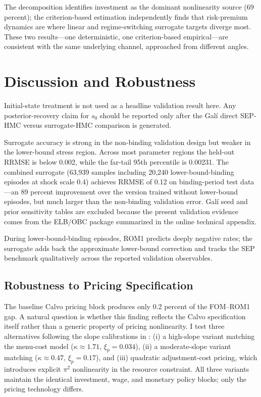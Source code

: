 \documentclass[12pt]{article}
\theoremstyle{plain}
\theoremstyle{definition}
\theoremstyle{remark}
\begin{document}
The decomposition identifies investment as the dominant nonlinearity source (69 percent); the criterion-based estimation independently finds that risk-premium dynamics are where linear and regime-switching surrogate targets diverge most. These two results---one deterministic, one criterion-based empirical---are consistent with the same underlying channel, approached from different angles.


\section{Discussion and Robustness}
\label{sec:robustness}

Initial-state treatment is not used as a headline validation result here. Any posterior-recovery claim for $s_0$ should be reported only after the Gal\'i direct SEP-HMC versus surrogate-HMC comparison is generated.

Surrogate accuracy is strong in the non-binding validation design but weaker in the lower-bound stress region. Across most parameter regions the held-out RRMSE is below 0.002, while the far-tail 95th percentile is 0.00231. The combined surrogate (63,939 samples including 20,240 lower-bound-binding episodes at shock scale 0.4) achieves RRMSE of 0.12 on binding-period test data---an 89 percent improvement over the version trained without lower-bound episodes, but much larger than the non-binding validation error. Gal\'i seed and prior sensitivity tables are excluded because the present validation evidence comes from the ELB/OBC package summarized in the online technical appendix.

During lower-bound-binding episodes, ROM1 predicts deeply negative rates; the surrogate adds back the approximate lower-bound correction and tracks the SEP benchmark qualitatively across the reported validation observables.

\subsection{Robustness to Pricing Specification}
\label{subsec:pricing_robustness}

The baseline Calvo pricing block produces only 0.2 percent of the FOM--ROM1 gap. A natural question is whether this finding reflects the Calvo specification itself rather than a generic property of pricing nonlinearity. I test three alternatives following the slope calibrations in \citet{alvarez2024rise}: (i) a high-slope variant matching the \citet{golosov2007menu} menu-cost model ($\kappa \approx 1.71$, $\xi_p = 0.034$), (ii) a moderate-slope variant matching \citet{nakamura2010monetary} ($\kappa \approx 0.47$, $\xi_p = 0.17$), and (iii) \citet{rotemberg1982sticky} quadratic adjustment-cost pricing, which introduces explicit $\pi^2$ nonlinearity in the resource constraint. All three variants maintain the identical investment, wage, and monetary policy blocks; only the pricing technology differs.
\end{document}
